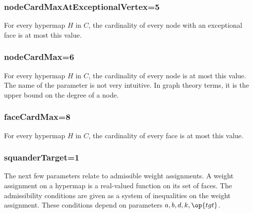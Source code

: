 \subsubsection{nodeCardMaxAtExceptionalVertex=5}

For every hypermap $H$ in $C$, the cardinality of every node with an exceptional face
is at most this value.

\subsubsection{nodeCardMax=6}

For every hypermap $H$ in $C$, the cardinality of every node is at most
this value.  The name of the parameter is not very intuitive.  In
graph theory terms, it is the upper bound on the degree of a node.

\subsubsection{faceCardMax=8}

For every hypermap $H$ in $C$, the cardinality of every face is at most
this value.  

\subsubsection{squanderTarget=1}

The next few parameters relate to admissible weight assignments.  A
weight assignment on a hypermap is a real-valued function on its set
of faces.  The admissibility conditions are given as a system of
inequalities on the weight assignment.  These conditions depend on parameters
$a,b,d,k,\op{tgt}$.

